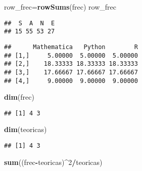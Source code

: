 \documentclass[
]{article}
\newenvironment{Shaded}{\begin{snugshade}}{\end{snugshade}}
\newcommand{\DecValTok}[1]{\textcolor[rgb]{0.00,0.00,0.81}{#1}}
\newcommand{\KeywordTok}[1]{\textcolor[rgb]{0.13,0.29,0.53}{\textbf{#1}}}
\newcommand{\NormalTok}[1]{#1}
\newcommand{\OperatorTok}[1]{\textcolor[rgb]{0.81,0.36,0.00}{\textbf{#1}}}
\begin{document}
\begin{Shaded}
\begin{Highlighting}[]
\NormalTok{row_frec=}\KeywordTok{rowSums}\NormalTok{(frec)}
\NormalTok{row_frec}
\end{Highlighting}
\end{Shaded}

\begin{verbatim}
##  S  A  N  E 
## 15 55 53 27
\end{verbatim}

\begin{Shaded}
\end{Shaded}

\begin{verbatim}
##      Mathematica   Python        R
## [1,]     5.00000  5.00000  5.00000
## [2,]    18.33333 18.33333 18.33333
## [3,]    17.66667 17.66667 17.66667
## [4,]     9.00000  9.00000  9.00000
\end{verbatim}

\begin{Shaded}
\begin{Highlighting}[]
\KeywordTok{dim}\NormalTok{(frec)}
\end{Highlighting}
\end{Shaded}

\begin{verbatim}
## [1] 4 3
\end{verbatim}

\begin{Shaded}
\begin{Highlighting}[]
\KeywordTok{dim}\NormalTok{(teoricas)}
\end{Highlighting}
\end{Shaded}

\begin{verbatim}
## [1] 4 3
\end{verbatim}

\begin{Shaded}
\begin{Highlighting}[]
\KeywordTok{sum}\NormalTok{((frec}\OperatorTok{-}\NormalTok{teoricas)}\OperatorTok{^}\DecValTok{2}\OperatorTok{/}\NormalTok{teoricas)}
\end{Highlighting}
\end{Shaded}
\end{document}
